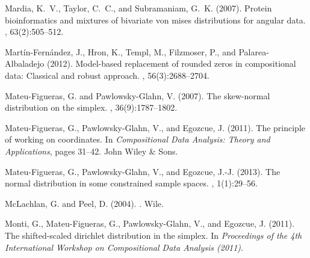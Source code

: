 \documentclass[10pt, a4paper]{article}
\begin{document}
\begin{thebibliography}{00}

Mardia, K.~V., Taylor, C.~C., and Subramaniam, G.~K. (2007).
\newblock Protein bioinformatics and mixtures of bivariate von mises
  distributions for angular data.
, 63(2):505--512.

Mart\'in-Fern\'andez, J., Hron, K., Templ, M., Filzmoser, P., and
  Palarea-Albaladejo (2012).
\newblock Model-based replacement of rounded zeros in compositional data:
  Classical and robust approach.
, 56(3):2688--2704.

Mateu-Figueras, G. and Pawlowsky-Glahn, V. (2007).
\newblock The skew-normal distribution on the simplex.
, 36(9):1787--1802.

Mateu-Figueras, G., Pawlowsky-Glahn, V., and Egozcue, J. (2011).
\newblock The principle of working on coordinates.
\newblock In {\em Compositional Data Analysis: Theory and Applications}, pages
  31--42. John Wiley \& Sons.

Mateu-Figueras, G., Pawlowsky-Glahn, V., and Egozcue, J.-J. (2013).
\newblock The normal distribution in some constrained sample spaces.
,
  1(1):29--56.

McLachlan, G. and Peel, D. (2004).
.
\newblock Wile.


Monti, G., Mateu-Figueras, G., Pawlowsky-Glahn, V., and Egozcue, J. (2011).
\newblock The shifted-scaled dirichlet distribution in the simplex.
\newblock In {\em Proceedings of the 4th International Workshop on
  Compositional Data Analysis (2011)}.


\end{thebibliography}
\end{document}
